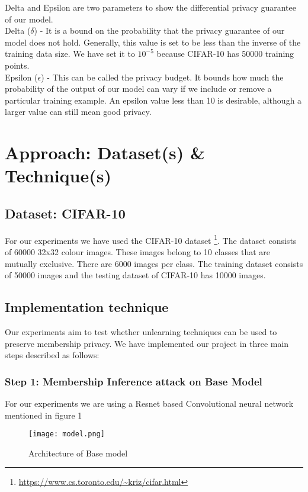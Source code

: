 \documentclass[11pt,letterpaper]{article}
\begin{document}
Delta and Epsilon are two parameters to show the differential privacy guarantee of our model.
\\Delta ($\delta$) - It is a bound on the probability that the privacy guarantee of our model does not hold. Generally, this value is set to be less than the inverse of the training data size. We have set it to $10^{-5}$ because CIFAR-10 has 50000 training points. 
\\Epsilon ($\epsilon$) - This can be called the privacy budget. It bounds how much the probability of the output of our model can vary if we include or remove a particular training example. An epsilon value less than 10 is desirable, although a larger value can still mean good privacy.

\section{Approach: Dataset(s) \& Technique(s)}

\subsection{Dataset: CIFAR-10}
For our experiments we have used the CIFAR-10 dataset \footnote{\url{https://www.cs.toronto.edu/~kriz/cifar.html}}. The dataset consists of 60000 32x32 colour images. These images belong to 10 classes that are mutually exclusive. There are 6000 images per class. The training dataset consists of 50000 images and the testing dataset of CIFAR-10 has 10000 images. 
\subsection{Implementation technique}
Our experiments aim to test whether unlearning techniques can be used to preserve membership privacy. We have implemented our project in three main steps described as follows:
\subsubsection{Step 1: Membership Inference attack on Base Model}
For our experiments we are using a Resnet based Convolutional neural network mentioned in figure 1
\begin{figure}[!htp]
    \centering
    \texttt{[image: model.png]}
    \caption{Architecture of Base model}
    \label{fig:galaxy1}
\end{figure}
\end{document}
